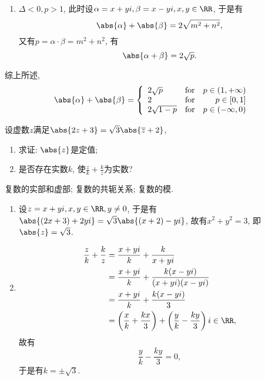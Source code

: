 \documentclass[8pt]{article}
\begin{document}
\begin{easonbigproblem}
\begin{enumerate}[label = \calword{(\arabic*)}]
\begin{enumerate}[label = \calword{(2.\arabic*)}]
						\item	\(\Delta < 0, p > 1\), 此时设\(\alpha = x + yi, \beta = x - yi, x, y \in \RR\), 于是有
							\begin{displaymath}
								\abs{\alpha} + \abs{\beta} = 2\sqrt{m^2 + n^2},
							\end{displaymath}
							又有\(p = \alpha \cdot \beta = m^2 + n^2\), 有
							\begin{displaymath}
								\abs{\alpha + \beta} = 2\sqrt{p}.
							\end{displaymath}
					\end{enumerate}

					综上所述,
					\begin{displaymath}
						\abs{\alpha} + \abs{\beta} = \left\{
							\begin{array}{lcr}
								2\sqrt{p} & \text{for} & p \in (1, +\infty)\\
								2 & \text{for} & p \in [0, 1]\\
								2\sqrt{1-p} & \text{for} & p \in (-\infty, 0)
							\end{array}
						\right.
					\end{displaymath}

			\end{enumerate}
			
		\end{easonbigproblem}

		\begin{easonbigproblem}
			设虚数\(z\)满足\(\abs{2z+3} = \sqrt{3} \abs{\overline{z} + 2}\),
			\begin{enumerate}[label = \calword{(\arabic*)}]
				\item 求证: \(\abs{z}\)是定值;
    			\item 是否存在实数\(k\), 使\(\displaystyle \frac{z}{k} + \frac{k}{z}\)为实数?
			\end{enumerate}
			\subbigproblem
			 复数的实部和虚部; 复数的共轭关系; 复数的模.
			\begin{enumerate}[label = \calword{(\arabic*)}]
				\item 设\(z = x + yi, x, y \in \RR, y \neq 0\), 于是有\(\abs{(2x+3) + 2yi} = \sqrt{3} \abs{(x+2) - yi}\), 故有\(x^2 + y^2 = 3\), 即\(\abs{z} = \sqrt{3}\).
				\item 
					\begin{align}
						\frac{z}{k} + \frac{k}{z} &= \frac{x+yi}{k} + \frac{k}{x+yi}\\
						&= \frac{x+yi}{k} + \frac{k(x-yi)}{(x+yi)(x-yi)}\\
						&= \frac{x+yi}{k} + \frac{k(x-yi)}{3}\\
						&= \left(\frac{x}{k} + \frac{kx}{3}\right) + \left(\frac{y}{k} - \frac{ky}{3}\right)i \in \RR,
					\end{align}
					故有
					\begin{displaymath}
						\frac{y}{k} - \frac{ky}{3} = 0,
					\end{displaymath}
					于是有\(k = \pm \sqrt{3}\).
			\end{enumerate}
		\end{easonbigproblem}
\end{document}
